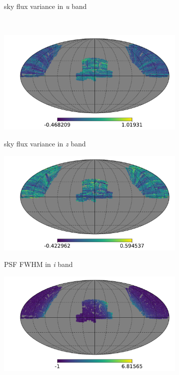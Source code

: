 \begin{figure}
\begin{subfigure}{.33\textwidth}
\label{fig:systmap15}
    \caption{sky flux variance in \textit{u} band}
\end{subfigure}
\\
\begin{subfigure}{.33\textwidth}
  \centering
\includegraphics[scale=0.214]{SystematicMaps2/map_sdss_dr12_systematics_skysigmaz.pdf}
\label{fig:systmap16}
    \caption{sky flux variance in \textit{z} band}
\end{subfigure}
\begin{subfigure}{.33\textwidth}
  \centering
\includegraphics[scale=0.214]{SystematicMaps2/map_sdss_dr12_systematics_psffwhmi.pdf}
\label{fig:systmap17}
    \caption{PSF FWHM in \textit{i} band}
\end{subfigure}
\begin{subfigure}{.33\textwidth}
  \centering
\includegraphics[scale=0.214]{SystematicMaps2/map_cmass_All_stellar_overdensity_N512.pdf}

\end{subfigure}
\end{figure}
